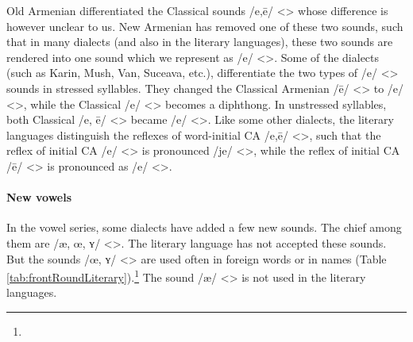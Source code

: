Old Armenian differentiated the Classical sounds /e,ē/ <> whose difference is however unclear to us. New Armenian has removed one of these two sounds, such that in many dialects (and also in the literary languages), these two sounds are rendered into one sound which we represent as /e/ <>. Some of the dialects (such as Karin, Mush, Van, Suceava, etc.), differentiate the two types of /e/ <> sounds in stressed syllables. They changed the Classical Armenian /ē/ <> to /e/ <>, while the Classical /e/ <> becomes a diphthong. In unstressed syllables, both Classical /e, ē/ <> became /e/ <>. Like some other dialects, the literary languages distinguish the reflexes of word-initial CA /e,ē/ <>, such that the reflex of initial CA /e/ <> is pronounced /je/ <>, while the reflex of initial CA /ē/ <> is pronounced as /e/ <>. 





\begin{adjarianpage}\label{page:16}\end{adjarianpage}%

\paragraph{New vowels}

In the vowel series, some dialects have added a few new sounds. The chief among them are /æ, œ, ʏ/ <>. The literary language has not accepted these sounds. But the sounds /œ, ʏ/ <> are used often in foreign words or in names (Table \ref{tab:frontRoundLiterary}).\footnote{} The sound /æ/ <> is not used in the literary languages.

\begin{table}[H]
	\centering
	\caption{Front round vowels in borrowings in literary Armenian (Standard Western Armenian)}
	\label{tab:frontRoundLiterary}
	\end{table}

